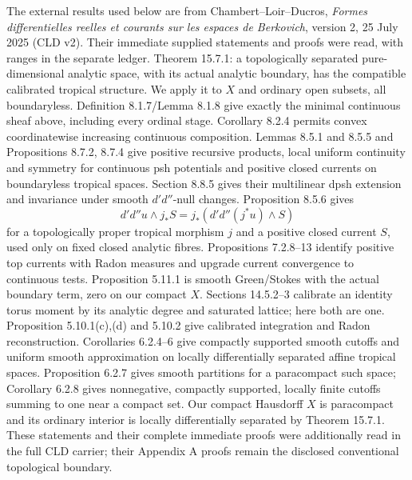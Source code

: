 \documentclass[11pt]{article}
\newcommand{\DD}{d'd''}
\begin{document}
The external results used below are from Chambert--Loir--Ducros,
\emph{Formes differentielles reelles et courants sur les espaces de
Berkovich}, version 2, 25 July 2025 (CLD v2). Their immediate supplied
statements and proofs were read, with ranges in the separate ledger.
Theorem 15.7.1: a topologically separated pure-dimensional analytic space,
with its actual analytic boundary, has the compatible calibrated tropical
structure. We apply it to $X$ and ordinary open subsets, all boundaryless.
Definition 8.1.7/Lemma 8.1.8 give exactly the minimal continuous sheaf
above, including every ordinal stage. Corollary 8.2.4 permits convex
coordinatewise increasing continuous composition.
Lemmas 8.5.1 and 8.5.5 and Propositions 8.7.2, 8.7.4 give positive
recursive products, local uniform continuity and symmetry for continuous
psh potentials and positive closed currents on boundaryless tropical spaces.
Section 8.8.5 gives their multilinear dpsh extension and invariance under
smooth $\DD$-null changes. Proposition 8.5.6 gives
\[
 \DD u\wedge j_*S=j_*(\DD(j^*u)\wedge S)
\]
for a topologically proper tropical morphism $j$ and a positive closed
current $S$, used only on fixed closed analytic fibres. Propositions
7.2.8--13 identify positive top currents with Radon measures and upgrade
current convergence to continuous tests. Proposition 5.11.1 is smooth
Green/Stokes with the actual boundary term, zero on our compact $X$.
Sections 14.5.2--3 calibrate an identity torus moment by its analytic
degree and saturated lattice; here both are one. Proposition 5.10.1(c),(d)
and 5.10.2 give calibrated integration and Radon reconstruction.
Corollaries 6.2.4--6 give compactly supported smooth cutoffs and uniform
smooth approximation on locally differentially separated affine tropical
spaces. Proposition 6.2.7 gives smooth partitions for a paracompact such
space; Corollary 6.2.8 gives nonnegative, compactly supported, locally
finite cutoffs summing to one near a compact set. Our compact Hausdorff
$X$ is paracompact and its ordinary interior is locally differentially
separated by Theorem 15.7.1. These statements and their complete immediate
proofs were additionally read in the full CLD carrier; their Appendix A
proofs remain the disclosed conventional topological boundary.
\end{document}
